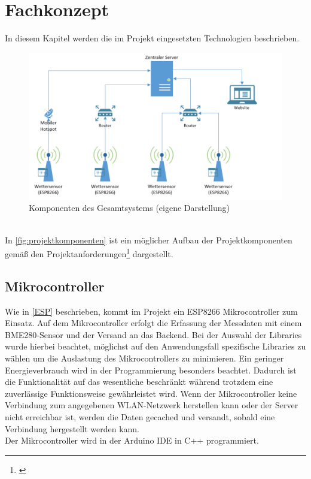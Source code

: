 \section{Fachkonzept}
In diesem Kapitel werden die im Projekt eingesetzten Technologien beschrieben.\\
\begin{figure}[h]
    \centering
    \includegraphics[width=0.7\linewidth]{img/projektkomponenten}
    \caption[Komponenten des Gesamtsystems]{Komponenten des Gesamtsystems (eigene Darstellung)}
    \label{fig:projektkomponenten}
\end{figure}
\\
In \autoref{fig:projektkomponenten} ist ein möglicher Aufbau der Projektkomponenten gemäß den Projektanforderungen\footnote{\cite{Wortmann.2020}} dargestellt.

\subsection{Mikrocontroller}
Wie in \autoref{ESP} beschrieben, kommt im Projekt ein ESP8266 Mikrocontroller zum Einsatz.
Auf dem Mikrocontroller erfolgt die Erfassung der Messdaten mit einem BME280-Sensor und der Versand an das Backend.
Bei der Auswahl der Libraries wurde hierbei beachtet, möglichst auf den Anwendungsfall spezifische Libraries zu wählen um die Auslastung des Mikrocontrollers zu minimieren.
Ein geringer Energieverbrauch wird in der Programmierung besonders beachtet.
Dadurch ist die Funktionalität auf das wesentliche beschränkt während trotzdem eine zuverlässige Funktionsweise gewährleistet wird.
Wenn der Mikrocontroller keine Verbindung zum angegebenen WLAN-Netzwerk herstellen kann oder der Server nicht erreichbar ist, werden die Daten gecached und versandt, sobald eine Verbindung hergestellt werden kann.\\
Der Mikrocontroller wird in der Arduino IDE in C++ programmiert.

